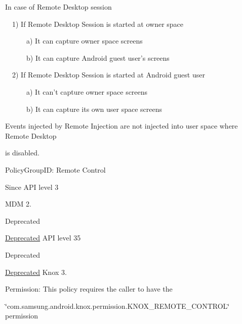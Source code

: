 \par


\-In case of \-Remote \-Desktop session\par


~~1) \-If \-Remote \-Desktop \-Session is started at owner space\par


~~~~~~a) \-It can capture owner space screens\par


~~~~~~b) \-It can capture \-Android guest user's screens\par


~~2) \-If \-Remote \-Desktop \-Session is started at \-Android guest user\par


~~~~~~a) \-It can't capture owner space screens\par


~~~~~~b) \-It can capture its own user space screens\par


\-Events injected by \-Remote \-Injection are not injected into user space where \-Remote \-Desktop

is disabled.

\par


\begin{DoxyParagraph}{\-Policy\-Group\-I\-D\-: }
\-Remote \-Control
\end{DoxyParagraph}
\begin{DoxySince}{\-Since}
\-A\-P\-I level 3

\-M\-D\-M 2.
\end{DoxySince}
\begin{DoxyRefDesc}{\-Deprecated}
\item[\hyperlink{deprecated__deprecated000001}{\-Deprecated}]\-A\-P\-I level 35\end{DoxyRefDesc}


\begin{DoxyRefDesc}{\-Deprecated}
\item[\hyperlink{deprecated__deprecated000002}{\-Deprecated}]\-Knox 3.\end{DoxyRefDesc}


\begin{DoxyParagraph}{\-Permission\-: }
\-This policy requires the caller to have the
\end{DoxyParagraph}
\char`\"{}com.\-samsung.\-android.\-knox.\-permission.\-K\-N\-O\-X\-\_\-\-R\-E\-M\-O\-T\-E\-\_\-\-C\-O\-N\-T\-R\-O\-L\char`\"{} permission

